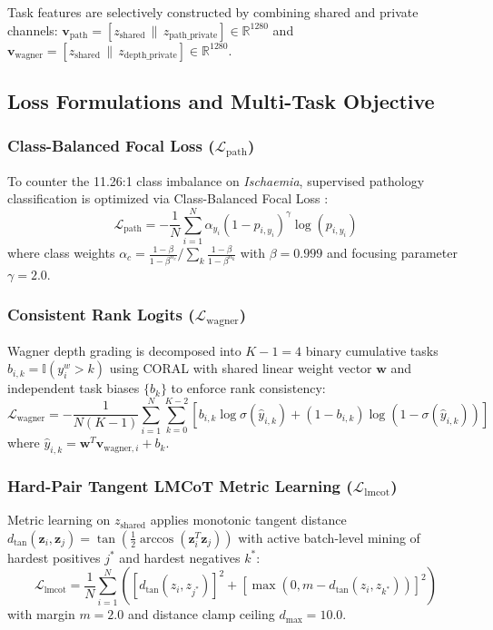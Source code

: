 \documentclass[journal]{IEEEtran}
\begin{document}
Task features are selectively constructed by combining shared and private channels: $\mathbf{v}_{\text{path}} = [z_{\text{shared}} \,\|\, z_{\text{path\_private}}] \in \mathbb{R}^{1280}$ and $\mathbf{v}_{\text{wagner}} = [z_{\text{shared}} \,\|\, z_{\text{depth\_private}}] \in \mathbb{R}^{1280}$.

\subsection{Loss Formulations and Multi-Task Objective}

\subsubsection{Class-Balanced Focal Loss ($\mathcal{L}_{\text{path}}$)}
To counter the 11.26:1 class imbalance on \textit{Ischaemia}, supervised pathology classification is optimized via Class-Balanced Focal Loss \cite{cui2019class}:
\begin{equation}
    \mathcal{L}_{\text{path}} = -\frac{1}{N} \sum_{i=1}^N \alpha_{y_i} \left(1 - p_{i, y_i}\right)^\gamma \log\left(p_{i, y_i}\right)
\end{equation}
where class weights $\alpha_c = \frac{1 - \beta}{1 - \beta^{n_c}} / \sum_{k} \frac{1 - \beta}{1 - \beta^{n_k}}$ with $\beta = 0.999$ and focusing parameter $\gamma = 2.0$.

\subsubsection{Consistent Rank Logits ($\mathcal{L}_{\text{wagner}}$)}
Wagner depth grading is decomposed into $K-1=4$ binary cumulative tasks $b_{i, k} = \mathbb{I}(y_i^w > k)$ using CORAL \cite{cao2020rank} with shared linear weight vector $\mathbf{w}$ and independent task biases $\{b_k\}$ to enforce rank consistency:
\begin{equation}
    \mathcal{L}_{\text{wagner}} = -\frac{1}{N (K-1)} \sum_{i=1}^N \sum_{k=0}^{K-2} \left[ b_{i, k} \log \sigma(\hat{y}_{i, k}) + (1 - b_{i, k}) \log \left(1 - \sigma(\hat{y}_{i, k})\right) \right]
\end{equation}
where $\hat{y}_{i, k} = \mathbf{w}^T \mathbf{v}_{\text{wagner}, i} + b_k$.

\subsubsection{Hard-Pair Tangent LMCoT Metric Learning ($\mathcal{L}_{\text{lmcot}}$)}
\label{sec:method_metric}
Metric learning on $z_{\text{shared}}$ applies monotonic tangent distance $d_{\tan}(\mathbf{z}_i, \mathbf{z}_j) = \tan\left(\frac{1}{2} \arccos(\mathbf{z}_i^T \mathbf{z}_j)\right)$ with active batch-level mining of hardest positives $j^*$ and hardest negatives $k^*$:
\begin{equation}
    \mathcal{L}_{\text{lmcot}} = \frac{1}{N} \sum_{i=1}^N \left( \left[d_{\tan}(z_i, z_{j^*})\right]^2 + \left[\max\left(0, m - d_{\tan}(z_i, z_{k^*})\right)\right]^2 \right)
\end{equation}
with margin $m = 2.0$ and distance clamp ceiling $d_{\max} = 10.0$.
\end{document}
